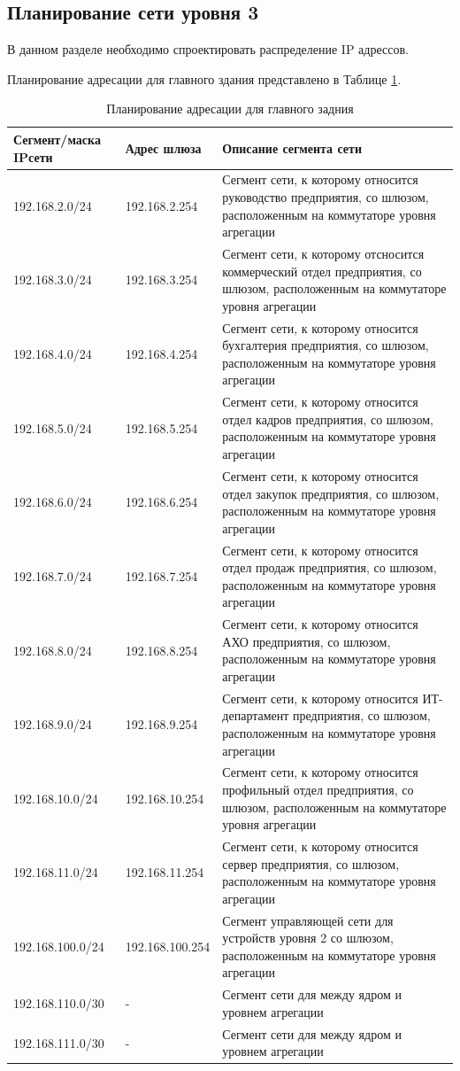 \documentclass[14pt, a4paper]{extarticle}
\numberwithin{equation}{section}
\begin{document}
\subsection{Планирование сети уровня 3}
В данном разделе необходимо спроектировать распределение IP адрессов.

Планирование адресации для главного здания представлено в Таблице \ref{table:mainDepIpPlan}.
\begin{table}[H]
\centering
\small
\caption{Планирование адресации для главного задния}
\label{table:mainDepIpPlan}
\begin{tabular}{|m{4cm}|m{3cm}|m{8cm}|}
\hline
\textbf{Сегмент/маска IPсети} & \textbf{Адрес шлюза} & \textbf{Описание сегмента сети} \\
\hline
192.168.2.0/24 & 192.168.2.254 & Сегмент сети, к которому относится руководство предприятия, со шлюзом, расположенным на коммутаторе уровня агрегации
\\ \hline
192.168.3.0/24 & 192.168.3.254 & Сегмент сети, к которому отсносится коммерческий отдел предприятия, со шлюзом, расположенным на коммутаторе уровня агрегации
\\ \hline
192.168.4.0/24 & 192.168.4.254 & Сегмент сети, к которому относится бухгалтерия предприятия, со шлюзом, расположенным на коммутаторе уровня агрегации
\\ \hline
192.168.5.0/24 & 192.168.5.254 & Сегмент сети, к которому относится отдел кадров предприятия, со шлюзом, расположенным на коммутаторе уровня агрегации
\\ \hline
192.168.6.0/24 & 192.168.6.254 & Сегмент сети, к которому относится отдел закупок предприятия, со шлюзом, расположенным на коммутаторе уровня агрегации
\\ \hline
192.168.7.0/24 & 192.168.7.254 & Сегмент сети, к которому относится отдел продаж предприятия, со шлюзом, расположенным на коммутаторе уровня агрегации
\\ \hline
192.168.8.0/24 & 192.168.8.254 & Сегмент сети, к которому относится АХО предприятия, со шлюзом, расположенным на коммутаторе уровня агрегации
\\ \hline
192.168.9.0/24 & 192.168.9.254 & Сегмент сети, к которому относится ИТ-департамент предприятия, со шлюзом, расположенным на коммутаторе уровня агрегации
\\ \hline
192.168.10.0/24 & 192.168.10.254 & Сегмент сети, к которому относится профильный отдел предприятия, со шлюзом, расположенным на коммутаторе уровня агрегации
\\ \hline
192.168.11.0/24 & 192.168.11.254 & Сегмент сети, к которому относится сервер предприятия, со шлюзом, расположенным на коммутаторе уровня агрегации
\\ \hline
192.168.100.0/24 & 192.168.100.254 & Сегмент управляющей сети для устройств уровня 2 со шлюзом, расположенным на коммутаторе уровня агрегации 
\\ \hline
192.168.110.0/30 & - & Сегмент сети для между ядром и уровнем агрегации
\\ \hline
192.168.111.0/30 & - & Сегмент сети для между ядром и уровнем агрегации
\\ \hline
\end{tabular}
\end{table}
\end{document}
